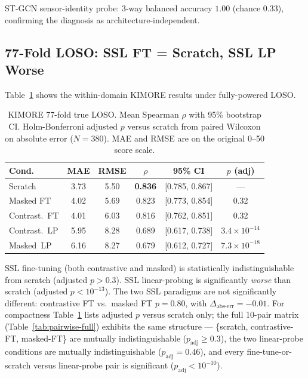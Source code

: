 \documentclass[10pt,journal]{IEEEtran}
\begin{document}
ST-GCN sensor-identity probe: 3-way balanced accuracy $1.00$ (chance $0.33$), confirming the diagnosis as architecture-independent.

\subsection{77-Fold LOSO: SSL FT = Scratch, SSL LP Worse}
\label{sec:loso-results}

Table~\ref{tab:loso} shows the within-domain KIMORE results under fully-powered LOSO.

\begin{table}[t]
\centering
\small
\setlength{\tabcolsep}{3pt}
\caption{KIMORE 77-fold true LOSO. Mean Spearman $\rho$ with 95\% bootstrap CI. Holm-Bonferroni adjusted $p$ versus scratch from paired Wilcoxon on absolute error ($N=380$). MAE and RMSE are on the original 0--50 score scale.}
\label{tab:loso}
\begin{tabular}{@{}lccccc@{}}
\toprule
Cond. & MAE & RMSE & $\rho$ & 95\% CI & $p$ (adj) \\
\midrule
Scratch     & 3.73 & 5.50 & \textbf{0.836} & [0.785, 0.867] & --- \\
Masked FT   & 4.02 & 5.69 & 0.823          & [0.773, 0.854] & 0.32 \\
Contrast.~FT & 4.01 & 6.03 & 0.816         & [0.762, 0.851] & 0.32 \\
Contrast.~LP & 5.95 & 8.28 & 0.689         & [0.617, 0.738] & $3.4{\times}10^{-14}$ \\
Masked~LP   & 6.16 & 8.27 & 0.679          & [0.612, 0.727] & $7.3{\times}10^{-18}$ \\
\bottomrule
\end{tabular}
\end{table}

SSL fine-tuning (both contrastive and masked) is statistically indistinguishable from scratch (adjusted $p > 0.3$). SSL linear-probing is significantly \emph{worse} than scratch (adjusted $p < 10^{-13}$). The two SSL paradigms are not significantly different: contrastive FT vs.\ masked FT $p = 0.80$, with $\Delta_{\text{abs-err}} = -0.01$. For compactness Table~\ref{tab:loso} lists adjusted $p$ versus scratch only; the full 10-pair matrix (Table~\ref{tab:pairwise-full}) exhibits the same structure --- \{scratch, contrastive-FT, masked-FT\} are mutually indistinguishable ($p_{\text{adj}} \geq 0.3$), the two linear-probe conditions are mutually indistinguishable ($p_{\text{adj}} = 0.46$), and every fine-tune-or-scratch versus linear-probe pair is significant ($p_{\text{adj}} < 10^{-10}$).
\end{document}
